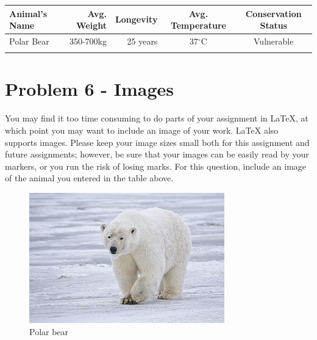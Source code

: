 \documentclass[12pt]{article}
\begin{document}

\begin{tabular}{ | l || r  | r | c | c |} \hline
  Animal's Name & Avg. Weight & Longevity & Avg. Temperature & Conservation Status  \\ \hline
   Polar Bear & 350-700kg & 25 years & 37$^{\circ}$C  & Vulnerable \\ \hline
    & & & & \\ \hline
\end{tabular}

\section*{Problem 6 - Images}
You may find it too time consuming to do parts of your assignment in \LaTeX{}, at which 
point you may want to include an image of your work. \LaTeX{} also supports images. 
Please keep your image sizes small both for this assignment and future assignments; 
however, be sure that your images can be easily read by your markers, or you run the 
risk of losing marks. For this question, include an image of the animal you entered
in the table above.\\


\begin{figure}
\begin{center}
        \includegraphics[scale=0.5]{polar_bear.jpg}
\end{center}
\caption{\label{figcaption} Polar bear}
\end{figure}
\end{document}
